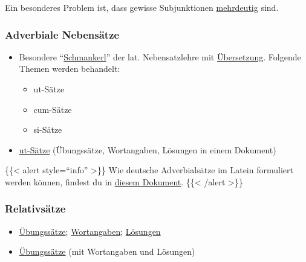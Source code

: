 \documentclass{scrartcl}
\begin{document}
Ein besonderes Problem ist, dass gewisse Subjunktionen \href{https://www.dropbox.com/s/dchnzatbir1f1jg/Mehrdeutige\%20Nebensatzeinleitungen2.pdf?dl=0}{mehrdeutig} sind.

\subsubsection{Adverbiale Nebensätze}
\label{sec:orgf772ec3}

\begin{itemize}
\item Besondere "`\href{https://www.dropbox.com/s/qundz0kc7wi3sp0/grammatik.pdf?dl=0}{Schmankerl}"' der lat. Nebensatzlehre mit
\href{https://www.dropbox.com/s/rv0zs8gtuk155ho/Grammatikrepetition\_\%25C3\%259Cbersetzung.pdf?dl=0}{Übersetzung}. Folgende Themen werden behandelt:
\begin{itemize}
\item ut-Sätze
\item cum-Sätze
\item si-Sätze
\end{itemize}
\item \href{https://www.dropbox.com/s/smmjy9k0a33qfwm/\%25C2\%25A751ut.pdf?dl=0}{ut-Sätze} (Übungssätze, Wortangaben, Lösungen in einem Dokument)
\end{itemize}

\{\{< alert style="`info"' >\}\}
  Wie deutsche Adverbialsätze im Latein formuliert werden können, findest du in \href{https://www.dropbox.com/s/spd916spyliu4zu/dt\_Adverbials\%C3\%A4tze\_im\_Lat.pdf?dl=0}{diesem Dokument}.
\{\{< /alert >\}\}

\subsubsection{Relativsätze}
\label{sec:orgd187e18}

\begin{itemize}
\item \href{https://www.dropbox.com/s/60ggp3yeav4ofe8/Relativs\%25C3\%25A4tze.pdf?dl=0}{Übungssätze}; \href{https://www.dropbox.com/s/ipz22adwi00i8o8/\%25C2\%25A747Relativs\%25C3\%25A4tze.pdf?dl=0}{Wortangaben}; \href{https://www.dropbox.com/s/fttk7f0dwqlrag9/Relativs\%25C3\%25A4tze\_L\%25C3\%25B6sung.pdf?dl=0}{Lösungen}
\item \href{https://www.dropbox.com/s/xxtjdft670v04y2/Relativsatz.pdf?dl=0}{Übungssätze} (mit Wortangaben und Lösungen)
\end{itemize}
\end{document}
